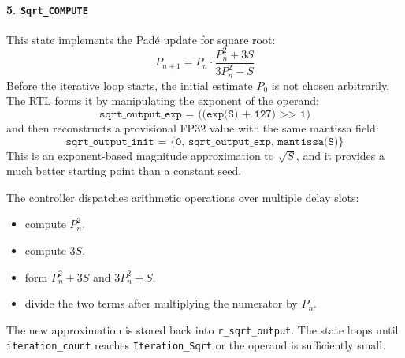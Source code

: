 \paragraph{5. \texttt{Sqrt\_COMPUTE}}
This state implements the Pad\'e update for square root:
\begin{equation}
P_{n+1} = P_n \cdot \frac{P_n^2 + 3S}{3P_n^2 + S}
\end{equation}
Before the iterative loop starts, the initial estimate $P_0$ is not chosen arbitrarily. The RTL forms it by manipulating the exponent of the operand:
\begin{equation}
\texttt{sqrt\_output\_exp = ((exp(S) + 127) >> 1)}
\end{equation}
and then reconstructs a provisional FP32 value with the same mantissa field:
\begin{equation}
\texttt{sqrt\_output\_init = \{0, sqrt\_output\_exp, mantissa(S)\}}
\end{equation}
This is an exponent-based magnitude approximation to $\sqrt{S}$, and it provides a much better starting point than a constant seed.

The controller dispatches arithmetic operations over multiple delay slots:
\begin{itemize}
    \item compute $P_n^2$,
    \item compute $3S$,
    \item form $P_n^2 + 3S$ and $3P_n^2 + S$,
    \item divide the two terms after multiplying the numerator by $P_n$.
\end{itemize}
The new approximation is stored back into \texttt{r\_sqrt\_output}. The state loops until \texttt{iteration\_count} reaches \texttt{Iteration\_Sqrt} or the operand is sufficiently small.

